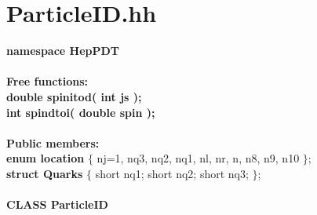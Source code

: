 \section {ParticleID.hh}
\label{PID}

\begin{tabbing}

{\bf namespace HepPDT} \\  \\

{\bf Free functions:} \\
\hspace{0.5in}  {\bf double spinitod( int js ); } \\
\hspace{0.5in}  {\bf int spindtoi( double spin ); } \\  \\

{\bf Public members:} \\
\hspace{0.5in}  {\bf enum location } 
       $\{$ nj=1, nq3, nq2, nq1, nl, nr, n, n8, n9, n10 $\}$; \\
\hspace{0.5in}  {\bf  struct Quarks } $\{$
    short nq1;
    short nq2;
    short nq3; $\}$; \\  \\

{\bf CLASS ParticleID } \\  \\


\end{tabbing}
